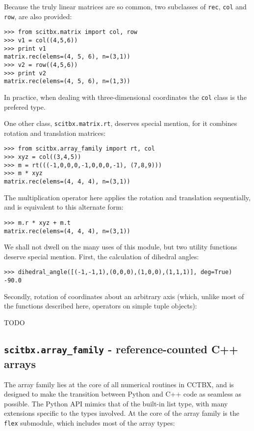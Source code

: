 \documentclass{article}
\begin{document}
Because the truly linear matrices are so common, two subclasses of {\tt rec},
{\tt col} and {\tt row}, are also provided:

\begin{Verbatim}
>>> from scitbx.matrix import col, row
>>> v1 = col((4,5,6))
>>> print v1
matrix.rec(elems=(4, 5, 6), n=(3,1))
>>> v2 = row((4,5,6))
>>> print v2
matrix.rec(elems=(4, 5, 6), n=(1,3))
\end{Verbatim}


In practice, when dealing with three-dimensional coordinates the {\tt col}
class is the prefered type.


One other class, {\tt scitbx.matrix.rt}, deserves special mention, for it
combines rotation and translation matrices:

\begin{Verbatim}
>>> from scitbx.array_family import rt, col
>>> xyz = col((3,4,5))
>>> m = rt(((-1,0,0,0,-1,0,0,0,-1), (7,8,9)))
>>> m * xyz
matrix.rec(elems=(4, 4, 4), n=(3,1))
\end{Verbatim}


The multiplication operator here applies the rotation and translation
sequentially, and is equivalent to this alternate form:

\begin{Verbatim}
>>> m.r * xyz + m.t
matrix.rec(elems=(4, 4, 4), n=(3,1))
\end{Verbatim}


We shall not dwell on the many uses of this module, but two utility functions
deserve special mention.  First, the calculation of dihedral angles:

\begin{Verbatim}
>>> dihedral_angle([(-1,-1,1),(0,0,0),(1,0,0),(1,1,1)], deg=True)
-90.0
\end{Verbatim}


Secondly, rotation of coordinates about an arbitrary axis (which, unlike most
of the functions described here, operators on simple tuple objects):

TODO



\subsection{{\tt scitbx.array\_family} - reference-counted C++ arrays}

The array family lies at the core of all numerical routines in CCTBX, and is
designed to make the transition between Python and C++ code as seamless as
possible.  The Python API mimics that of the built-in list type, with many
extensions specific to the types involved.  At the core of the array family is
the {\tt flex} submodule, which includes most of the array types:
\end{document}
